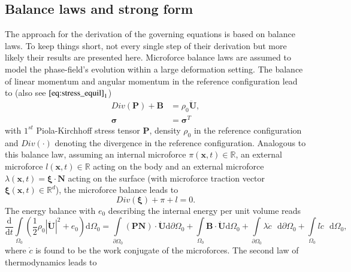 \subsection{Balance laws and strong form} \label{appsec:balance_laws}
The approach for the derivation of the governing equations is based on balance laws. To keep things short, not every single step of their derivation but more likely their results are presented here. Microforce balance laws are assumed to model the phase-field's evolution within a large deformation setting. The balance of linear momentum and angular momentum in the reference configuration lead to (also see $\eqref{eq:stress_equil}_{1}$)
\begin{equation} \label{eq:lin_mom_ang_mom}
	\begin{aligned}
		Div\left(\mathbf{P}\right)+\mathbf{B}&=\rho_{0}\ddot{\mathbf{U}}, \\
		\bm{\sigma} &= \bm{\sigma}^{T}
	\end{aligned}
\end{equation}
with $1^{st}$ Piola-Kirchhoff stress tensor $\mathbf{P}$, density $\rho_{0}$ in the reference configuration and $Div\left(\cdot\right)$ denoting the divergence in the reference configuration. Analogous to this balance law, assuming an internal microforce $\pi\left(\mathbf{x},t\right)\in\mathbb{R}$, an external microforce $l\left(\mathbf{x},t\right)\in\mathbb{R}$ acting on the body and an external microforce $\lambda\left(\mathbf{x},t\right)=\bm{\xi}\cdot\mathbf{N}$ acting on the surface (with microforce traction vector $\bm{\xi}\left(\mathbf{x},t\right)\in\mathbb{R}^{d}$), the microforce balance leads to
\begin{equation} \label{eq:microforce_balance}
	Div\left(\bm{\xi}\right)+\pi+l=0.
\end{equation}
The energy balance with $e_{0}$ describing the internal energy per unit volume reads
\begin{equation} \label{eq:energy_balance}
	\dfrac{\mathrm{d}}{\mathrm{d}t}\int\limits_{\Omega_{0}}\left(\dfrac{1}{2}\rho_{0}|\dot{\mathbf{U}}|^{2}+e_{0}\right)\mathrm{d}\Omega_{0} = 
	\int\limits_{\partial\Omega_{0}}\left(\mathbf{P}\mathbf{N}\right)\cdot\dot{\mathbf{U}}\mathrm{d}\partial\Omega_{0}+\int\limits_{\Omega_{0}}\mathbf{B}\cdot\dot{\mathbf{U}}\mathrm{d}\Omega_{0}+\int\limits_{\partial\Omega_{0}}\lambda\dot{c}\text{ }\mathrm{d}\partial\Omega_{0}+\int\limits_{\Omega_{0}}l\dot{c}\text{ }\mathrm{d}\Omega_{0},
\end{equation}
where $\dot{c}$ is found to be the work conjugate of the microforces. The second law of thermodynamics leads to

